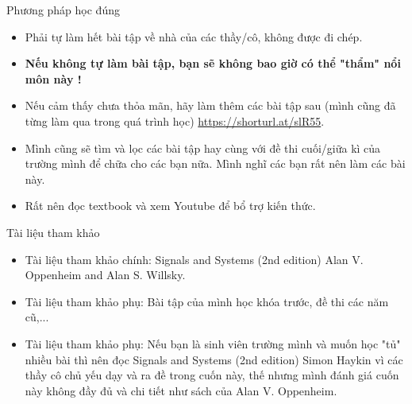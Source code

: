 \documentclass[8pt]{beamer}
\begin{document}
\begin{frame}{Phương pháp học đúng}
	\begin{itemize}
		\item \alert{Phải tự làm hết bài tập về nhà của các thầy/cô, không được đi chép.}
		\item \textbf{Nếu không tự làm bài tập, bạn sẽ không bao giờ có thể "thẩm" nổi môn này !}
		\item Nếu cảm thấy chưa thỏa mãn, hãy làm thêm các bài tập sau (mình cũng đã từng làm qua trong quá trình học) \url{https://shorturl.at/slR55}.
		\item Mình cũng sẽ tìm và lọc các bài tập hay cùng với đề thi cuối/giữa kì của trường mình để chữa cho các bạn nữa. Mình nghĩ các bạn rất nên làm các bài này.
		\item Rất nên đọc textbook và xem Youtube để bổ trợ kiến thức.
	\end{itemize}
\end{frame}
\begin{frame}{Tài liệu tham khảo}
	\begin{itemize}
		\item Tài liệu tham khảo chính: Signals and Systems (2nd edition) Alan V. Oppenheim and Alan S. Willsky.
		\item Tài liệu tham khảo phụ: Bài tập của mình học khóa trước, đề thi các năm cũ,...
		\item Tài liệu tham khảo phụ: Nếu bạn là sinh viên trường mình và muốn học "tủ" nhiều bài thì nên đọc Signals and Systems (2nd edition) Simon Haykin vì các thầy cô chủ yếu dạy và ra đề trong cuốn này, thế nhưng mình đánh giá cuốn này không đầy đủ và chi tiết như sách của Alan V. Oppenheim. 
	\end{itemize}
\end{frame}
\end{document}
